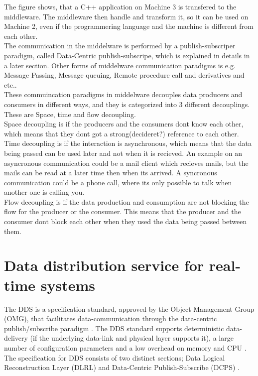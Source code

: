 \documentclass[Main]{subfiles}
\begin{document}
The figure shows, that a C++ application on Machine 3 is transfered to the middleware. The middleware then handle and transform it, so it can be used on Machine 2, even if the programmering language and the machine is different from each other. 
\\
The communication in the middelware is performed by a publish-subscriper paradigm, called Data-Centric publish-subscripe, which is explained in details in a later section. Other forms of middelware communication paradigms is e.g. Message Passing, Message queuing, Remote procedure call and derivatives and etc.\cite{DDS-slides}.\\
These commuincation paradigms in middelware decouples data producers and consumers in different ways, and they is categorized into 3 different decouplings. These are Space, time and flow decoupling. \\
Space decoupling is if the producers and the consumers dont know each other, which means that they dont got a strong(decideret?) reference to each other. 
\\
Time decoupling is if the interaction is asynchronous, which means that the data being passed can be used later and not when it is recieved. An example on an asyncronous communication could be a mail client which recieves mails, but the mails can be read at a later time then when its arrived. A syncronous communication could be a phone call, where its only possible to talk when another one is calling you. \\
Flow decoupling is if the data production and consumption are not blocking the flow for the producer or the consumer. This means that the producer and the consumer dont block each other when they used the data being passed between them. 

\section{Data distribution service for real-time systems}
The DDS is a specification standard, approved by the Object Management Group (OMG), that facilitates data-communication through the data-centric publish/subscribe paradigm \cite{RTI}. The DDS standard supports deterministic data-delivery (if the underlying data-link and physical layer supports it), a large number of configuration parameters and a low overhead on memory and CPU \cite{DDS-slides}.\\
The specification for DDS consists of two distinct sections; Data Logical Reconstruction Layer (DLRL) and Data-Centric Publish-Subscribe (DCPS) \cite{DDS-slides}.
\end{document}
